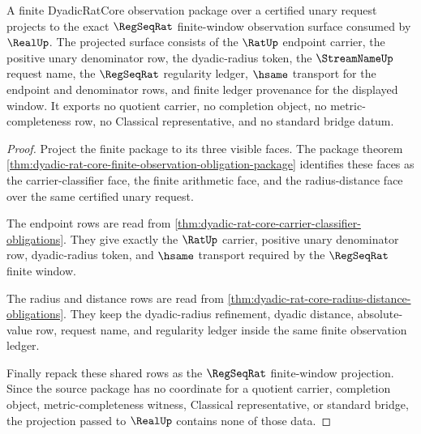\begin{theorem}
\label{thm:realup-regseqrat-finite-window-projection}
A finite DyadicRatCore observation package over a certified unary request
projects to the exact $\RegSeqRat$ finite-window observation surface consumed by
$\RealUp$. The projected surface consists of the $\RatUp$ endpoint carrier, the
positive unary denominator row, the dyadic-radius token, the $\StreamNameUp$
request name, the $\RegSeqRat$ regularity ledger, $\hsame$ transport for the
endpoint and denominator rows, and finite ledger provenance for the displayed
window. It exports no quotient carrier, no completion object, no
metric-completeness row, no Classical representative, and no standard bridge
datum.
\end{theorem}
\begin{proof}
Project the finite package to its three visible faces. The package theorem
\autoref{thm:dyadic-rat-core-finite-observation-obligation-package} identifies
these faces as the carrier-classifier face, the finite arithmetic face, and the
radius-distance face over the same certified unary request.

The endpoint rows are read from
\autoref{thm:dyadic-rat-core-carrier-classifier-obligations}. They give exactly
the $\RatUp$ carrier, positive unary denominator row, dyadic-radius token, and
$\hsame$ transport required by the $\RegSeqRat$ finite window.

The radius and distance rows are read from
\autoref{thm:dyadic-rat-core-radius-distance-obligations}. They keep the
dyadic-radius refinement, dyadic distance, absolute-value row, request name,
and regularity ledger inside the same finite observation ledger.

Finally repack these shared rows as the $\RegSeqRat$ finite-window projection.
Since the source package has no coordinate for a quotient carrier, completion
object, metric-completeness witness, Classical representative, or standard
bridge, the projection passed to $\RealUp$ contains none of those data.
\end{proof}

